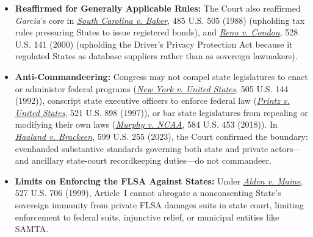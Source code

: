 \documentclass[12pt]{article}
\begin{document}
\begin{itemize}

\item \textbf{Reaffirmed for Generally Applicable Rules:} The Court also reaffirmed \textit{Garcia}'s core in \href{https://supreme.justia.com/cases/federal/us/485/505/}{\textit{South Carolina v. Baker}}, 485 U.S. 505 (1988) (upholding tax rules pressuring States to issue registered bonds), and \href{https://supreme.justia.com/cases/federal/us/528/141/}{\textit{Reno v. Condon}}, 528 U.S. 141 (2000) (upholding the Driver's Privacy Protection Act because it regulated States as database suppliers rather than as sovereign lawmakers).

\item \textbf{Anti-Commandeering:} Congress may not compel state legislatures to enact or administer federal programs (\href{https://supreme.justia.com/cases/federal/us/505/144/}{\textit{New York v. United States}}, 505 U.S. 144 (1992)), conscript state executive officers to enforce federal law (\href{https://supreme.justia.com/cases/federal/us/521/898/}{\textit{Printz v. United States}}, 521 U.S. 898 (1997)), or bar state legislatures from repealing or modifying their own laws (\href{https://supreme.justia.com/cases/federal/us/584/16-476/}{\textit{Murphy v. NCAA}}, 584 U.S. 453 (2018)). In \href{https://supreme.justia.com/cases/federal/us/599/21-376/}{\textit{Haaland v. Brackeen}}, 599 U.S. 255 (2023), the Court confirmed the boundary: evenhanded substantive standards governing both state and private actors---and ancillary state-court recordkeeping duties---do not commandeer.

\item \textbf{Limits on Enforcing the FLSA Against States:} Under \href{https://supreme.justia.com/cases/federal/us/527/706/}{\textit{Alden v. Maine}}, 527 U.S. 706 (1999), Article~I cannot abrogate a nonconsenting State's sovereign immunity from private FLSA damages suits in state court, limiting enforcement to federal suits, injunctive relief, or municipal entities like SAMTA.

\end{itemize}
\end{document}
